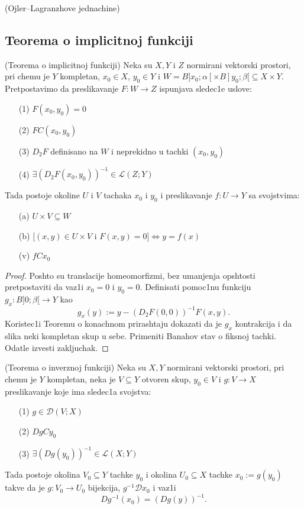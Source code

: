 \documentclass[a4paper,12pt]{article}
\begin{document}
\begin{pr}(Ojler--Lagranzhove jednachine)
\end{pr}

\newpage

\subsection{Teorema o implicitnoj funkciji}

\begin{tma}
(Teorema o implicitnoj funkciji) Neka su $X, Y$ i $Z$ normirani vektorski prostori, pri chemu je $Y$ kompletan, $x_0 \in X$, $y_0 \in Y$ i $W = B]x_0; \alpha[ \times B]y_0; \beta[ \subseteq X \times Y$. Pretpostavimo da preslikavanje $F:W \to Z$ ispunjava sledec1e uslove:
\begin{enumerate}
\item[(1)] $F(x_0, y_0) = 0$
\item[(2)] $FC(x_0, y_0)$
\item[(3)] $D_2F$ definisano na $W$ i neprekidno u tachki $(x_0, y_0)$
\item[(4)] $\exists {(D_2F(x_0, y_0))}^{-1} \in \mathcal{L} (Z; Y)$
\end{enumerate}
Tada postoje okoline $U$ i $ V$ tachaka $x_0$ i $y_0$ i preslikavanje $f: U \to Y$ sa svojstvima:
\begin{enumerate}
\item[(a)] $U \times V \subseteq W$
\item[(b)] $[(x,y)\in U \times V$ i $F(x,y) = 0] \iff y = f(x)$
\item[(v)] $fCx_0$

\end{enumerate}
\end{tma}
\begin{proof}
Poshto su translacije homeomorfizmi, bez umanjenja opshtosti pretpostaviti da vaz1i $x_0 = 0 $ i $y_0 = 0$. Definisati pomoc1nu funkciju $g_x: B]0; \beta[ \to Y$ kao \[g_x(y) := y - {(D_2F(0, 0))}^{-1} F(x,y).\] Koristec1i Teoremu o konachnom prirashtaju dokazati da je $g_x$ kontrakcija i da slika neki kompletan skup u sebe. Primeniti Banahov stav o fiksnoj tachki. Odatle izvesti zakljuchak. 
\end{proof}
\begin{tma}
(Teorema o inverznoj funkciji) Neka su $X, Y$ normirani vektorski prostori, pri chemu je $Y$ kompletan, neka je $V \subseteq Y$ otvoren skup, $y_0 \in V$ i $g: V \to X$ preslikavanje koje ima sledec1a svojstva:
\begin{enumerate}
\item[(1)] $g \in \mathcal{D}(V;X)$
\item[(2)] $DgCy_0$
\item[(3)] $\exists {(Dg(y_0))}^{-1} \in \mathcal{L} (X; Y)$
\end{enumerate}
Tada postoje okolina $V_0 \subseteq Y$ tachke $y_0$ i okolina $U_0 \subseteq X$ tachke $x_0 := g(y_0)$ takve da je $g: V_0 \to U_0$ bijekcija, $g^{-1} \mathcal{D} x_0$ i vaz1i \[ Dg^{-1}(x_0) = {(Dg(y))}^{-1}.\]
\end{tma}
\end{document}
